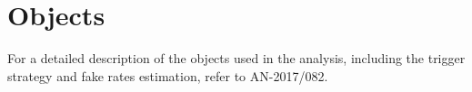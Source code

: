 \section{Objects}\label{sec:Objects}

For a detailed description of the objects used in the analysis, including the
trigger strategy and fake rates estimation, refer to AN-2017/082.
